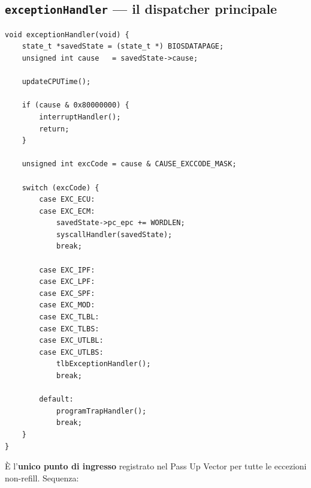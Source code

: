 \documentclass[11pt,a4paper]{article}
\newcommand{\func}[1]{\textbf{\texttt{#1}}}
\begin{document}
\subsection{\func{exceptionHandler} --- il dispatcher principale}
\begin{lstlisting}
void exceptionHandler(void) {
    state_t *savedState = (state_t *) BIOSDATAPAGE;
    unsigned int cause   = savedState->cause;

    updateCPUTime();

    if (cause & 0x80000000) {
        interruptHandler();
        return;
    }

    unsigned int excCode = cause & CAUSE_EXCCODE_MASK;

    switch (excCode) {
        case EXC_ECU:
        case EXC_ECM:
            savedState->pc_epc += WORDLEN;
            syscallHandler(savedState);
            break;

        case EXC_IPF:
        case EXC_LPF:
        case EXC_SPF:
        case EXC_MOD:
        case EXC_TLBL:
        case EXC_TLBS:
        case EXC_UTLBL:
        case EXC_UTLBS:
            tlbExceptionHandler();
            break;

        default:
            programTrapHandler();
            break;
    }
}
\end{lstlisting}
È l'\textbf{unico punto di ingresso} registrato nel Pass Up Vector per tutte
le eccezioni non-refill. Sequenza:
\end{document}
